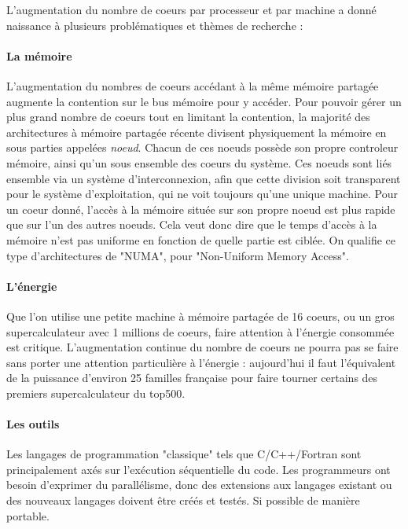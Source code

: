 L'augmentation du nombre de coeurs par processeur et par machine a donné naissance à plusieurs problématiques et thèmes de recherche :

\paragraph{La mémoire}
L'augmentation du nombres de coeurs accédant à la même mémoire partagée augmente la contention sur le bus mémoire pour y accéder.
Pour pouvoir gérer un plus grand nombre de coeurs tout en limitant la contention, la majorité des architectures à mémoire partagée récente divisent physiquement la mémoire en sous parties appelées \emph{noeud}.
Chacun de ces noeuds possède son propre controleur mémoire, ainsi qu'un sous ensemble des coeurs du système.
Ces noeuds sont liés ensemble via un système d'interconnexion, afin que cette division soit transparent pour le système d'exploitation, qui ne voit toujours qu'une unique machine.
Pour un coeur donné, l'accès à la mémoire située sur son propre noeud est plus rapide que sur l'un des autres noeuds. Cela veut donc dire que le temps d'accès à la mémoire n'est pas uniforme en fonction de quelle partie est ciblée.
On qualifie ce type d'architectures de "NUMA", pour "Non-Uniform Memory Access".

\paragraph{L'énergie}

Que l'on utilise une petite machine à mémoire partagée de 16 coeurs, ou un gros supercalculateur avec 1 millions de coeurs, faire attention à l'énergie consommée est critique.
L'augmentation continue du nombre de coeurs ne pourra pas se faire sans porter une attention particulière à l'énergie : aujourd'hui il faut l'équivalent de la puissance d'environ 25 familles française pour faire tourner certains des premiers supercalculateur du top500.

\paragraph{Les outils}

Les langages de programmation "classique" tels que C/C++/Fortran sont principalement axés sur l'exécution séquentielle du code.
Les programmeurs ont besoin d'exprimer du parallélisme, donc des extensions aux langages existant ou des nouveaux langages doivent être créés et testés. Si possible de manière portable.


